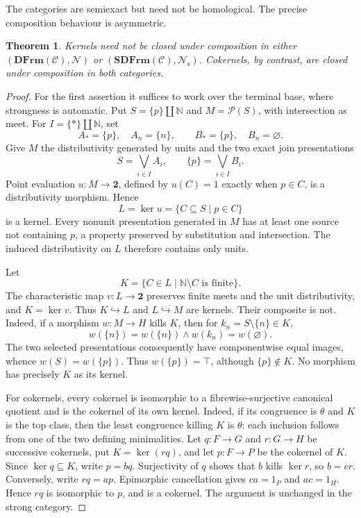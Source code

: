 \documentclass[12pt,oneside,reqno]{amsart}
\newtheorem{theorem}{Theorem}[section]
\theoremstyle{definition}
\theoremstyle{remark}
\newcommand{\C}{\mathcal C}
\newcommand{\DFrm}{\mathbf{DFrm}}
\newcommand{\SDFrm}{\mathbf{SDFrm}}
\newcommand{\Null}{\mathcal N}
\begin{document}
The categories are semiexact but need not be homological.  The precise
composition behaviour is asymmetric.

\begin{theorem}\label{thm:composition-normal-maps}
Kernels need not be closed under composition in either
\((\DFrm(\C),\Null)\) or \((\SDFrm(\C),\Null_{\mathrm s})\).  Cokernels,
by contrast, are closed under composition in both categories.
\end{theorem}

\begin{proof}
For the first assertion it suffices to work over the terminal base, where
strongness is automatic.  Put \(S=\{p\}\amalg\mathbb N\) and
\(M=\mathcal P(S)\), with intersection as meet.  For
\(I=\{*\}\amalg\mathbb N\), set
\[
 A_*=\{p\},\quad A_n=\{n\},\qquad
 B_*=\{p\},\quad B_n=\varnothing.
\]
Give \(M\) the distributivity generated by units and the two exact join
presentations
\[
                  S=\bigvee_{i\in I}A_i,\qquad
              \{p\}=\bigvee_{i\in I}B_i.
\]
Point evaluation \(u:M\to\mathbf2\), defined by
\(u(C)=1\) exactly when \(p\in C\), is a distributivity morphism.  Hence
\[
                         L=\ker u=\{C\subseteq S\mid p\in C\}
\]
is a kernel.  Every nonunit presentation generated in \(M\) has at
least one source not containing \(p\), a property preserved by
substitution and intersection.  The induced distributivity on \(L\)
therefore contains only units.

Let
\[
 K=\{C\in L\mid\mathbb N\setminus C\text{ is finite}\}.
\]
The characteristic map \(v:L\to\mathbf2\) preserves finite meets and
the unit distributivity, and \(K=\ker v\).  Thus
\(K\hookrightarrow L\) and \(L\hookrightarrow M\) are kernels.  Their
composite is not.  Indeed, if a morphism \(w:M\to H\) kills \(K\), then
for \(k_n=S\setminus\{n\}\in K\),
\[
 w(\{n\})=w(\{n\})\wedge w(k_n)=w(\varnothing).
\]
The two selected presentations consequently have componentwise equal
images, whence \(w(S)=w(\{p\})\).  Thus \(w(\{p\})=\top\), although
\(\{p\}\notin K\).  No morphism has precisely \(K\) as its kernel.

For cokernels, every cokernel is isomorphic to a fibrewise-surjective
canonical quotient and is the cokernel of its own kernel.  Indeed, if
its congruence is \(\theta\) and \(K\) is the top class, then the least
congruence killing \(K\) is \(\theta\): each inclusion follows from one
of the two defining minimalities.  Let \(q:F\to G\) and \(r:G\to H\)
be successive cokernels, put \(K=\ker(rq)\), and let \(p:F\to P\) be
the cokernel of \(K\).  Since \(\ker q\subseteq K\), write \(p=bq\).
Surjectivity of \(q\) shows that \(b\) kills \(\ker r\), so \(b=cr\).
Conversely, write \(rq=ap\).  Epimorphic cancellation gives
\(ca=1_P\) and \(ac=1_H\).  Hence \(rq\) is isomorphic to \(p\), and is
a cokernel.  The argument is unchanged in the strong category.
\end{proof}
\end{document}
